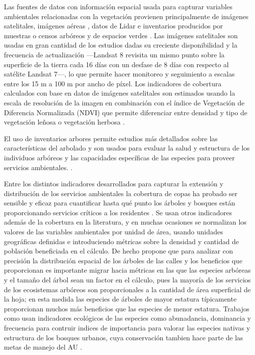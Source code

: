 \documentclass[12pt,]{book}
\begin{document}
Las fuentes de datos con información espacial usada para capturar
variables ambientales relacionadas con la vegetación provienen
principalmente de imágenes
satelitales\citep{landry_street_2009, troy_predicting_2007, vasquez_fuentes_vegetacion_2008, nesbitt_exploring_2016},
imágenes aéreas
\citep{azocar_urbanization_2007, heynen_political_2006, tratalos_urban_2007},
datos de Lidar \citep{shanahan_socio-economic_2014, schwarz_trees_2015}
e inventarios producidos por muestras o censos arbóreos y de espacios
verdes
\citetext{\citealp{comber_using_2008}; \citealp{killicoat_economic_2002}; \citealp[\citet{nowak_carbon_2002}]{nowak_urban_2000}; \citealp{talen_assessing_1998}}.
Las imágenes satelitales son usadas en gran cantidad de los estudios
dadas su creciente disponibilidad y la frecuencia de actualización
---Landsat 8 revisita un mismo punto sobre la superficie de la tierra
cada 16 días con un desfase de 8 días con respecto al satélite Landsat
7---, lo que permite hacer monitoreo y seguimiento a escalas entre los
15 m a 100 m por ancho de píxel. Los indicadores de cobertura calculados
con base en datos de imágenes satelitales son estimados usando la escala
de resolución de la imagen en combinación con el índice de Vegetación de
Diferencia Normalizada (NDVI) que permite diferenciar entre densidad y
tipo de vegetación leñosa o vegetación herbosa
\citep{nesbitt_exploring_2016}.

El uso de inventarios arbores permite estudios más detallados sobre las
características del arbolado y son usados para evaluar la salud y
estructura de los individuos arbóreos y las capacidades específicas de
las especies para proveer servicios ambientales.
\citep{killicoat_economic_2002, nowak_carbon_2002, cowett_methodology_2014}.

Entre los distintos indicadores desarrollados para capturar la extensión
y distribución de los servicios ambientales la cobertura de copas ha
probado ser sensible y eficaz para cuantificar hasta qué punto los
árboles y bosques están proporcionando servicios críticos a los
residentes \citep{nowak_sustaining_2010}. Se usan otros indicadores
además de la cobertura en la literatura, y en muchas ocasiones se
normalizan los valores de las variables ambientales por unidad de área,
usando unidades geográficas definidas e introduciendo métricas sobre la
densidad y cantidad de población beneficiada en el cálculo. De hecho
\citep{cowett_methodology_2014} propone que para analizar con precisión
la distribución espacial de los árboles de las calles y los beneficios
que proporcionan es importante migrar hacia métricas en las que las
especies arbóreas y el tamaño del árbol sean un factor en el cálculo,
pues la mayoría de los servicios de los ecosistemas arbóreos son
proporcionales a la cantidad de área superficial de la hoja; en esta
medida las especies de árboles de mayor estatura típicamente
proporcionan muchos más beneficios que las especies de menor estatura.
Trabajos como \citep{alanis_estructura_2014} usan indicadores ecológicos
de las especies como abunadancia, dominancia y frecuencia para contruir
indices de importancia para valorar las especies nativas y estructura de
los bosques urbanos, cuya conservación tambien hace parte de las metas
de manejo del AU \citep{nowak_sustaining_2010}.
\end{document}
